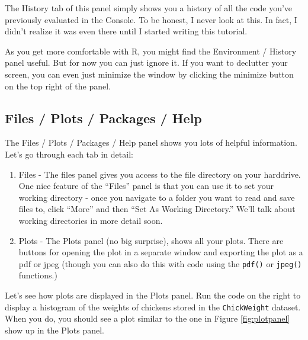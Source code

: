 \documentclass[]{book}
\newenvironment{Shaded}{\begin{snugshade}}{\end{snugshade}}
\newcommand{\KeywordTok}[1]{\textcolor[rgb]{0.13,0.29,0.53}{\textbf{{#1}}}}
\newcommand{\DataTypeTok}[1]{\textcolor[rgb]{0.13,0.29,0.53}{{#1}}}
\newcommand{\StringTok}[1]{\textcolor[rgb]{0.31,0.60,0.02}{{#1}}}
\newcommand{\NormalTok}[1]{{#1}}
\theoremstyle{definition}
\theoremstyle{definition}
\theoremstyle{remark}
\begin{document}
The History tab of this panel simply shows you a history of all the code
you've previously evaluated in the Console. To be honest, I never look
at this. In fact, I didn't realize it was even there until I started
writing this tutorial.

As you get more comfortable with R, you might find the Environment /
History panel useful. But for now you can just ignore it. If you want to
declutter your screen, you can even just minimize the window by clicking
the minimize button on the top right of the panel.

\subsection{Files / Plots / Packages /
Help}\label{files-plots-packages-help}

The Files / Plots / Packages / Help panel shows you lots of helpful
information. Let's go through each tab in detail:

\begin{enumerate}
\def\labelenumi{\arabic{enumi}.}
\item
  Files - The files panel gives you access to the file directory on your
  harddrive. One nice feature of the ``Files'' panel is that you can use
  it to set your working directory - once you navigate to a folder you
  want to read and save files to, click ``More'' and then ``Set As
  Working Directory.'' We'll talk about working directories in more
  detail soon.
\item
  Plots - The Plots panel (no big surprise), shows all your plots. There
  are buttons for opening the plot in a separate window and exporting
  the plot as a pdf or jpeg (though you can also do this with code using
  the \texttt{pdf()} or \texttt{jpeg()} functions.)
\end{enumerate}

Let's see how plots are displayed in the Plots panel. Run the code on
the right to display a histogram of the weights of chickens stored in
the \texttt{ChickWeight} dataset. When you do, you should see a plot
similar to the one in Figure \ref{fig:plotpanel} show up in the Plots
panel.

\begin{Shaded}
\end{Shaded}
\end{document}
